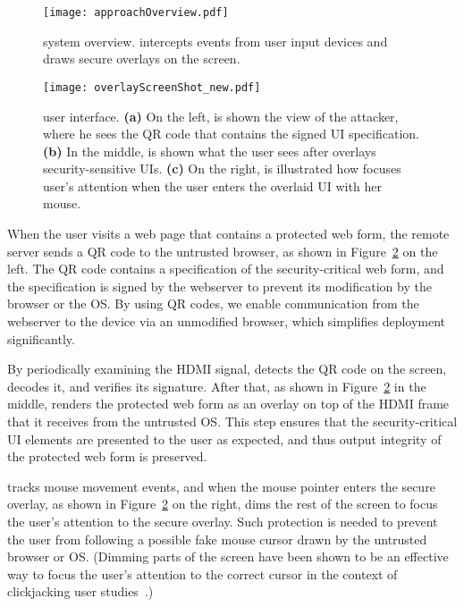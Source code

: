 \begin{figure}[t]
    \centering
    \texttt{[image: approachOverview.pdf]}
    \caption{\protection system overview. \hub intercepts events from user input devices and draws secure overlays on the screen.}
    \label{fig:architecture}
\end{figure}

\begin{figure}[t]
    \centering
    \texttt{[image: overlayScreenShot\_new.pdf]}
    \caption{\protection user interface. \textbf{(a)} On the left, is shown the view of the attacker, where he sees the QR code that contains the signed UI specification. \textbf{(b)} In the middle, is shown what the user sees after \hub overlays security-sensitive UIs. \textbf{(c)} On the right, is illustrated how \protection focuses user's attention when the user enters the overlaid UI with her mouse.}
    \label{fig:screenshot}
\end{figure}

When the user visits a web page that contains a protected web form, the remote server sends a QR code to the untrusted browser, as shown in Figure~\ref{fig:screenshot} on the left. The QR code contains a specification of the security-critical web form, and the specification is signed by the webserver to prevent its modification by the browser or the OS. By using QR codes, we enable communication from the webserver to the \hub device via an unmodified browser, which simplifies deployment significantly.

By periodically examining the HDMI signal, \hub detects the QR code on the screen, decodes it, and verifies its signature. After that, as shown in Figure~\ref{fig:screenshot} in the middle, \hub renders the protected web form as an overlay on top of the HDMI frame that it receives from the untrusted OS. This step ensures that the security-critical UI elements are presented to the user as expected, and thus output integrity of the protected web form is preserved.

\hub tracks mouse movement events, and when the mouse pointer enters the secure overlay, as shown in Figure~\ref{fig:screenshot} on the right, \hub dims the rest of the screen to focus the user's attention to the secure overlay. Such protection is needed to prevent the user from following a possible fake mouse cursor drawn by the untrusted browser or OS. (Dimming parts of the screen have been shown to be an effective way to focus the user's attention to the correct cursor in the context of clickjacking user studies~\cite{huang2012clickjacking}.)

